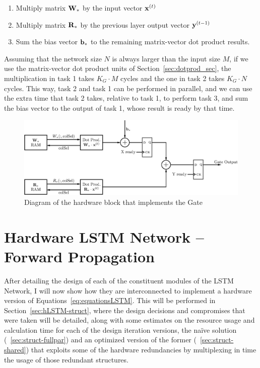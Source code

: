 \begin{enumerate}
    \item Multiply matrix $\mathbf{W}_*$ by the input vector $\mathbf{x}^{(t)}$
    \item Multiply matrix $\mathbf{R}_*$ by the previous layer output vector $\mathbf{y}^{(t-1)}$
    \item Sum the bias vector $\mathbf{b}_*$ to the remaining matrix-vector dot product results.
\end{enumerate}
Assuming that the network size $N$ is always larger than the input size $M$, if we use the matrix-vector dot product units of Section~\ref{sec:dotprod_sec}, the multiplication in task 1 takes $K_G\cdot M$ cycles and the one in task 2 takes $K_G\cdot N$ cycles. This way, task 2 and task 1 can be performed in parallel, and we can use the extra time that task 2 takes, relative to task 1,  to perform task 3, and sum the bias vector to the output of task 1, whose result is ready by that time.

\begin{figure}
    \centering
    \includegraphics[width=\linewidth]{figures/gate.eps}
    \caption[Diagram of the hardware block that implements the Gate]{Diagram of the hardware block that implements the Gate}
    \label{fig:gate}
\end{figure}

\section{Hardware LSTM Network -- Forward Propagation}\label{sec:hLSTM-fp}
After detailing the design of each of the constituent modules of the LSTM Network, I will now show how they are interconnected
to implement a hardware version of Equations~\ref{eq:equationsLSTM}. This will be performed in Section~\ref{sec:hLSTM-struct}, where the design decisions and compromises that were taken will be detailed, along with some estimates on the resource usage and calculation time for each of the design iteration versions, the naïve solution (~\ref{sec:struct-fullpar}) and an optimized version of the former (~\ref{sec:struct-shared}) that exploits some of the hardware redundancies by multiplexing in time the usage of those redundant structures.

